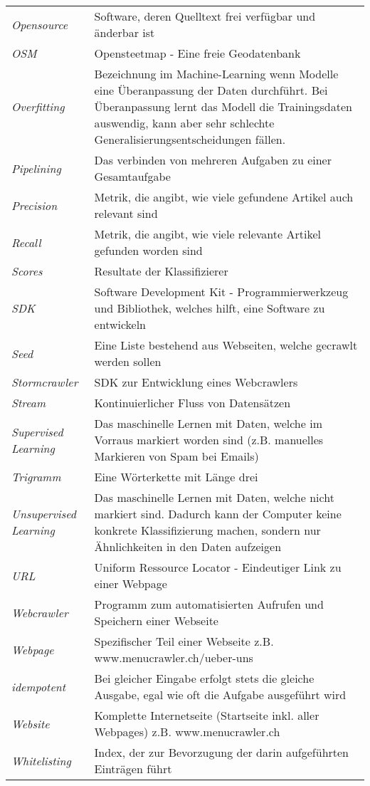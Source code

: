 \begin{table}[H]
	\begin{tabular}{>{\em}p{4cm}p{12cm}}
		Opensource & Software, deren Quelltext frei verfügbar und änderbar ist\\
		OSM & Opensteetmap - Eine freie Geodatenbank\\
		Overfitting & Bezeichnung im Machine-Learning wenn Modelle eine Überanpassung der Daten durchführt. Bei Überanpassung lernt das Modell die Trainingsdaten auswendig, kann aber sehr schlechte Generalisierungsentscheidungen fällen.\\
		Pipelining & Das verbinden von mehreren Aufgaben zu einer Gesamtaufgabe\\
		Precision & Metrik, die angibt, wie viele gefundene Artikel auch relevant sind\\
		Recall & Metrik, die angibt, wie viele relevante Artikel gefunden worden sind\\
		Scores & Resultate der Klassifizierer\\
		SDK & Software Development Kit - Programmierwerkzeug und Bibliothek, welches hilft, eine Software zu entwickeln\\
		Seed & Eine Liste bestehend aus Webseiten, welche gecrawlt werden sollen\\
		Stormcrawler & SDK zur Entwicklung eines Webcrawlers\\
		Stream & Kontinuierlicher Fluss von Datensätzen\\
		Supervised Learning & Das maschinelle Lernen mit Daten, welche im Vorraus markiert worden sind (z.B. manuelles Markieren von Spam bei Emails)\\
		Trigramm & Eine Wörterkette mit Länge drei\\
		Unsupervised Learning & Das maschinelle Lernen mit Daten, welche nicht markiert sind. Dadurch kann der Computer keine konkrete Klassifizierung machen, sondern nur Ähnlichkeiten in den Daten aufzeigen\\
		URL & Uniform Ressource Locator - Eindeutiger Link zu einer Webpage\\
		Webcrawler & Programm zum automatisierten Aufrufen und Speichern einer Webseite\\
		Webpage & Spezifischer Teil einer Webseite z.B. www.menucrawler.ch/ueber-uns\\
		idempotent & Bei gleicher Eingabe erfolgt stets die gleiche Ausgabe, egal wie oft die Aufgabe ausgeführt wird\\
		Website & Komplette Internetseite (Startseite inkl. aller Webpages) z.B. www.menucrawler.ch\\
		Whitelisting & Index, der zur Bevorzugung der darin aufgeführten Einträgen führt\\	
	\end{tabular}
\end{table}
